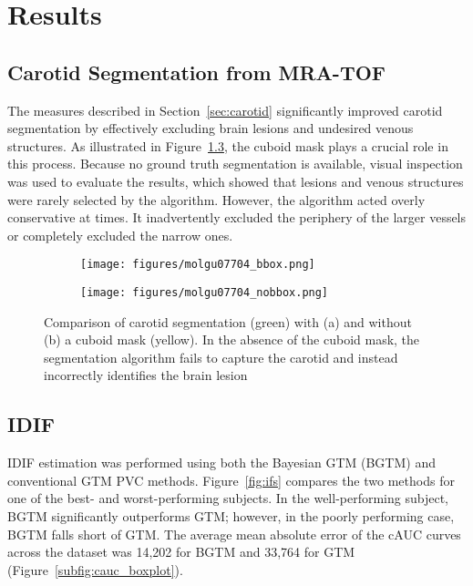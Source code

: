 \chapter{Results}
\section{Carotid Segmentation from MRA-TOF}
The measures described in Section~\ref{sec:carotid} significantly improved carotid segmentation by effectively excluding brain lesions and undesired venous structures.
As illustrated in Figure~\ref{fig:seg_compare}, the cuboid mask plays a crucial role in this process.
Because no ground truth segmentation is available, visual inspection was used to evaluate the results, which showed that lesions and venous structures were rarely selected by the algorithm.
However, the algorithm acted overly conservative at times. It inadvertently excluded the periphery of the larger vessels or completely excluded the narrow ones.
\begin{figure}[h]
	\centering
	\begin{subfigure}{0.45\textwidth}
		\texttt{[image: figures/molgu07704\_bbox.png]}
		\caption{}
		\label{subfig:seg_bbox}
	\end{subfigure}
	\begin{subfigure}{0.45\textwidth}
		\texttt{[image: figures/molgu07704\_nobbox.png]}
		\caption{}
		\label{subfig:seg_nobbox}
	\end{subfigure}
	\caption{Comparison of carotid segmentation (green) with (a) and without (b) a cuboid mask (yellow). In the absence of the cuboid mask, the segmentation algorithm fails to capture the carotid and instead incorrectly identifies the brain lesion}
	\label{fig:seg_compare}
\end{figure}
\section{IDIF}
IDIF estimation was performed using both the Bayesian GTM (BGTM) and conventional GTM PVC methods.
Figure~\ref{fig:ifs} compares the two methods for one of the best- and worst-performing subjects.
In the well-performing subject, BGTM significantly outperforms GTM; however, in the poorly performing case, BGTM falls short of GTM.
The average mean absolute error of the cAUC curves across the dataset was 14,202 for BGTM and 33,764 for GTM (Figure~\ref{subfig:cauc_boxplot}).

